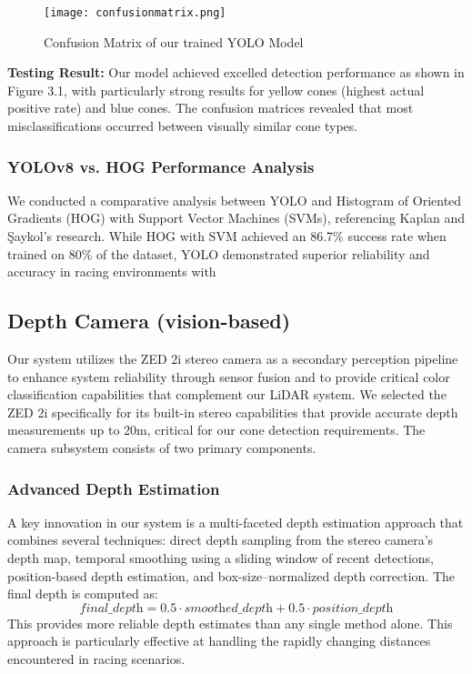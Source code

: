 \documentclass[conference]{IEEEtran}
\begin{document}
\begin{figure}[htbp]
\centerline{\texttt{[image: confusionmatrix.png]}}
\caption{Confusion Matrix of our trained YOLO Model}
\label{fig}
\end{figure}

\textbf{Testing Result:} Our model achieved excelled detection performance as shown in Figure 3.1, with particularly strong results for yellow cones (highest actual positive rate) and blue cones. The confusion matrices revealed that most misclassifications occurred between visually similar cone types.

\subsubsection{YOLOv8 vs. HOG Performance Analysis}
We conducted a comparative analysis between YOLO and Histogram of Oriented Gradients (HOG) with Support Vector Machines (SVMs), referencing Kaplan and Şaykol's research. While HOG with SVM achieved an 86.7\% success rate when trained on 80\% of the dataset, YOLO demonstrated superior reliability and accuracy in racing environments with

\subsection{Depth Camera (vision-based)}
Our system utilizes the ZED 2i stereo camera as a secondary perception pipeline to enhance system reliability through sensor fusion and to provide critical color classification capabilities that complement our LiDAR system. We selected the ZED 2i specifically for its built-in stereo capabilities that provide accurate depth measurements up to 20m, critical for our cone detection requirements. The camera subsystem consists of two primary components.

\subsubsection{Advanced Depth Estimation}
A key innovation in our system is a multi-faceted depth estimation approach that combines several techniques: direct depth sampling from the stereo camera's depth map, temporal smoothing using a sliding window of recent detections, position-based depth estimation, and box-size–normalized depth correction. The final depth is computed as:
\[
\textit{final\_depth} = 0.5 \cdot \textit{smoothed\_depth} + 0.5 \cdot \textit{position\_depth}
\]
This provides more reliable depth estimates than any single method alone. This approach is particularly effective at handling the rapidly changing distances encountered in racing scenarios.
\end{document}

